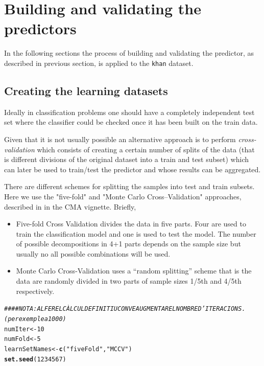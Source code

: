 \documentclass{article}\usepackage[]{graphicx}\usepackage[]{color}
\makeatletter
\newcommand{\hlnum}[1]{\textcolor[rgb]{0.686,0.059,0.569}{#1}}%
\newcommand{\hlstr}[1]{\textcolor[rgb]{0.192,0.494,0.8}{#1}}%
\newcommand{\hlcom}[1]{\textcolor[rgb]{0.678,0.584,0.686}{\textit{#1}}}%
\newcommand{\hlstd}[1]{\textcolor[rgb]{0.345,0.345,0.345}{#1}}%
\newcommand{\hlkwb}[1]{\textcolor[rgb]{0.69,0.353,0.396}{#1}}%
\newcommand{\hlkwd}[1]{\textcolor[rgb]{0.737,0.353,0.396}{\textbf{#1}}}%
\newenvironment{kframe}{%
 \def\at@end@of@kframe{}%
 \ifinner\ifhmode%
  \def\at@end@of@kframe{\end{minipage}}%
  \begin{minipage}{\columnwidth}%
 \fi\fi%
 \def\FrameCommand##1{\hskip\@totalleftmargin \hskip-\fboxsep
 \colorbox{shadecolor}{##1}\hskip-\fboxsep
     \hskip-\linewidth \hskip-\@totalleftmargin \hskip\columnwidth}%
 \MakeFramed {\advance\hsize-\width
   \@totalleftmargin\z@ \linewidth\hsize
   \@setminipage}}%
 {\par\unskip\endMakeFramed%
 \at@end@of@kframe}
\newenvironment{knitrout}{}{} %
\makeatother
\begin{document}
\section{Building and validating the predictors}

In the following sections the process of building and validating the predictor, as described in previous section, is applied to the \texttt{khan} dataset.




\subsection{Creating the learning datasets}

Ideally in classification problems one should have a completely independent test set where the classifier could be checked once it has been built on the train data. 

Given that it is not usually possible an alternative approach is to perform \emph{cross-validation} which consists of creating a certain number of splits of the data (that is different divisions of the original dataset into a train and test subset) which can later be used to train/test the predictor and whose results can be aggregated.

There are different schemes for splitting the samples into test and train subsets. Here we use  the "five-fold" and "Monte Carlo Cross--Validation" approaches, described in in the CMA vignette. Briefly,
\begin{itemize}
  \item Five-fold Cross Validation divides the data in five parts. Four are used to train the classification model and one is used to test the model. The number of possible decompositions in 4+1 parts depends on the sample size but usually no all possible combinations will be used.
  \item Monte Carlo Cross-Validation uses a ``random splitting'' scheme that is the data are randomly divided in two parts of sample sizes 1/5th and 4/5th respectively.
\end{itemize}

\begin{knitrout}
\color{fgcolor}\begin{kframe}
\begin{alltt}
\hlcom{#### NOTA: AL FER EL CÀLCUL DEFINITIU CONVE AUGMENTAR EL NOMBRE D'ITERACIONS. (per exemple a 1000)}
\hlstd{numIter} \hlkwb{<-} \hlnum{10}
\hlstd{numFold} \hlkwb{<-} \hlnum{5}
\hlstd{learnSetNames} \hlkwb{<-} \hlkwd{c}\hlstd{(}\hlstr{"fiveFold"}\hlstd{,} \hlstr{"MCCV"}\hlstd{)}
\hlkwd{set.seed}\hlstd{(}\hlnum{1234567}\hlstd{)}
\end{alltt}
\end{kframe}
\end{knitrout}
\end{document}
